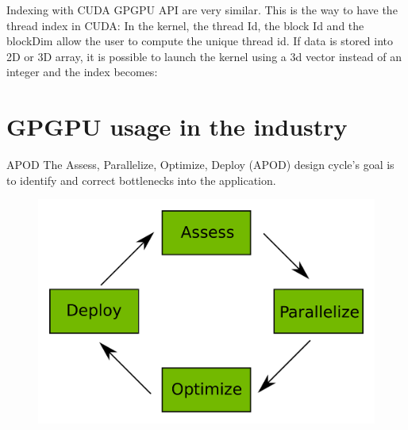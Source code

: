 \documentclass{beamer}
\begin{document}
\begin{frame}{Indexing with CUDA}
	GPGPU API are very similar. This is the way to have the thread index in CUDA:
	In the kernel, the thread Id, the block Id and the blockDim allow the user to compute the unique thread id.
	\codeIndex
	If data is stored into 2D or 3D array, it is possible to launch the kernel using a 3d vector instead of an integer and the index becomes:
	\codeIndexDim
\end{frame}

\section{GPGPU usage in the industry}
\begin{frame}{APOD}
	The Assess, Parallelize, Optimize, Deploy (APOD) design cycle's goal is to identify and correct bottlenecks into the application. 
	\begin{figure}
		\includegraphics[scale=0.3]{figures/APOD.pdf}
	\end{figure}
\end{frame}
\end{document}
